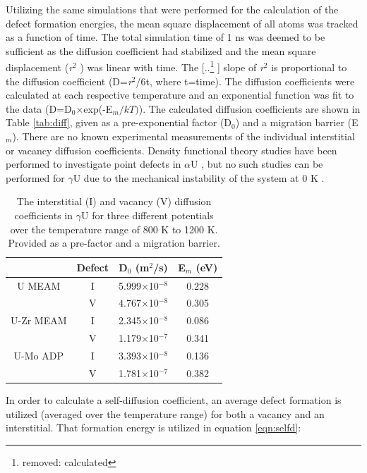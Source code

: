 \documentclass[review]{elsarticle}
\providecommand{\DIFaddtex}[1]{{\protect\color{blue} \sf #1}} %
\providecommand{\DIFdeltex}[1]{{\protect\color{red} [..\footnote{removed: #1} ]}} %
\providecommand{\DIFaddbegin}{} %
\providecommand{\DIFaddend}{} %
\providecommand{\DIFdelbegin}{} %
\providecommand{\DIFdelend}{} %
\providecommand{\DIFadd}[1]{\texorpdfstring{\DIFaddtex{#1}}{#1}} %
\providecommand{\DIFdel}[1]{\texorpdfstring{\DIFdeltex{#1}}{}} %
\newcommand{\DIFscaledelfig}{0.5}
\newlength{\DIFdelgraphicswidth} %
\newlength{\DIFdelgraphicsheight} %
\newcommand{\DIFaddincludegraphics}[2][]{{\color{blue}\fbox{\DIFOincludegraphics[#1]{#2}}}} %
\newcommand{\DIFdelincludegraphics}[2][]{%
\sbox{\DIFdelgraphicsbox}{\DIFOincludegraphics[#1]{#2}}%
\settoboxwidth{\DIFdelgraphicswidth}{\DIFdelgraphicsbox} %
\settoboxtotalheight{\DIFdelgraphicsheight}{\DIFdelgraphicsbox} %
\scalebox{\DIFscaledelfig}{%
\parbox[b]{\DIFdelgraphicswidth}{\usebox{\DIFdelgraphicsbox}\\[-\baselineskip] \rule{\DIFdelgraphicswidth}{0em}}\llap{\resizebox{\DIFdelgraphicswidth}{\DIFdelgraphicsheight}{%
\setlength{\unitlength}{\DIFdelgraphicswidth}%
\begin{picture}(1,1)%
\thicklines\linethickness{2pt} %
{\color[rgb]{1,0,0}\put(0,0){\framebox(1,1){}}}%
{\color[rgb]{1,0,0}\put(0,0){\line( 1,1){1}}}%
{\color[rgb]{1,0,0}\put(0,1){\line(1,-1){1}}}%
\end{picture}%
}\hspace*{3pt}}} %
} %
\DeclareRobustCommand{\DIFaddbegin}{\DIFOaddbegin \let\includegraphics\DIFaddincludegraphics} %
\DeclareRobustCommand{\DIFaddend}{\DIFOaddend \let\includegraphics\DIFOincludegraphics} %
\DeclareRobustCommand{\DIFdelbegin}{\DIFOdelbegin \let\includegraphics\DIFdelincludegraphics} %
\DeclareRobustCommand{\DIFdelend}{\DIFOaddend \let\includegraphics\DIFOincludegraphics} %
\begin{document}
Utilizing the same simulations that were performed for the calculation of the defect formation energies, the mean square displacement of all atoms was tracked as a function of time. The total simulation time of 1 ns was deemed to be sufficient as the diffusion coefficient had stabilized and \DIFaddbegin \DIFadd{the mean square displacement (}\DIFaddend \textit{r}$^{2}$\DIFaddbegin \DIFadd{) }\DIFaddend was linear with time. The \DIFdelbegin \DIFdel{calculated }\DIFdelend \DIFaddbegin \DIFadd{slope of \textit{r}$^{2}$ is proportional to the diffusion coefficient (D=\textit{r}$^{2}$/6t, where t=time). The diffusion coefficients were calculated at each respective temperature and an exponential function was fit to the data (D=D$_{0}$$\times$exp(-E$_{m}/kT)$). The calculated }\DIFaddend diffusion coefficients are shown in Table \ref{tab:diff}, given as a pre-exponential factor (D$_{0}$) and a migration barrier (E$_{m}$). There are no known experimental measurements of the individual interstitial or vacancy diffusion coefficients. Density functional theory studies have been performed to investigate point defects in $\alpha$U \cite{wirth2011}, but no such studies can be performed for $\gamma$U due to the mechanical instability of the system at 0 K \cite{beeler2010}.

\begin{table}[h]
\caption{The interstitial (I) and vacancy (V) diffusion coefficients in $\gamma$U for three different potentials over the temperature range of 800 K to 1200 K. Provided as a pre-factor and a migration barrier.} \label{tab:diff}
\begin{center}
\begin{tabular}{|c|c|c|c|}
	\hline
	& Defect & D$_{0}$ (m$^{2}$/s) & E$_{m}$ (eV)\\
	 \hline
	U MEAM & I & 5.999$\times$10$^{-8}$ & 0.228 \\
			& V & 4.767$\times$10$^{-8}$ & 0.305 \\
			\hline
	U-Zr MEAM & I & 2.345$\times$10$^{-8}$ & 0.086 \\
			& V & 1.179$\times$10$^{-7}$ & 0.341 \\
			\hline
	U-Mo ADP & I & 3.393$\times$10$^{-8}$ & 0.136 \\
			& V & 1.781$\times$10$^{-7}$ & 0.382 \\
	\hline
\end{tabular}
\end{center}
\label{default}
\end{table}

In order to calculate a self-diffusion coefficient, an average defect formation is utilized (averaged over the temperature range) for both a vacancy and an interstitial. That formation energy is utilized in equation \ref{eqn:selfd}:
\end{document}
